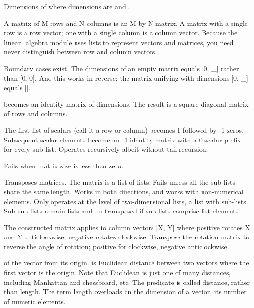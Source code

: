 \begin{description}
Dimensions of  where dimensions are  and .

A matrix of M rows and N columns is an M-by-N matrix. A matrix with
a single row is a row vector; one with a single column is a column
vector. Because the linear_algebra module uses lists to represent
vectors and matrices, you need never distinguish between row and
column vectors.

Boundary cases exist. The dimensions of an empty matrix \Snil{} equals
[0, _] rather than [0, 0]. And this works in reverse; the matrix
unifying with dimensions [0, _] equals [].

 becomes an identity matrix of  dimensions. The result is
a square diagonal matrix of  rows and  columns.

The first list of scalars (call it a row or column) becomes 1
followed by -1 zeros. Subsequent scalar elements become an
-1 identity matrix with a 0-scalar prefix for every sub-list.
Operates recursively albeit without tail recursion.

Fails when matrix size  is less than zero.

Transposes matrices. The matrix is a list of lists. Fails unless all
the sub-lists share the same length. Works in both directions, and
works with non-numerical elements. Only operates at the level of
two-dimensional lists, a list with sub-lists. Sub-sub-lists remain
lists and un-transposed if sub-lists comprise list elements.

The constructed matrix applies to column vectors [X, Y] where
positive  rotates X and Y anticlockwise; negative rotates
clockwise. Transpose the rotation matrix to reverse the angle of
rotation; positive for clockwise, negative anticlockwise.

\nodescription
 of the vector  from its origin.  is Euclidean
distance between two vectors where the first vector is the origin.
Note that Euclidean is just one of many distances, including
Manhattan and chessboard, etc. The predicate is called distance,
rather than length. The term length overloads on the dimension of a
vector, its number of numeric elements.


\end{description}
